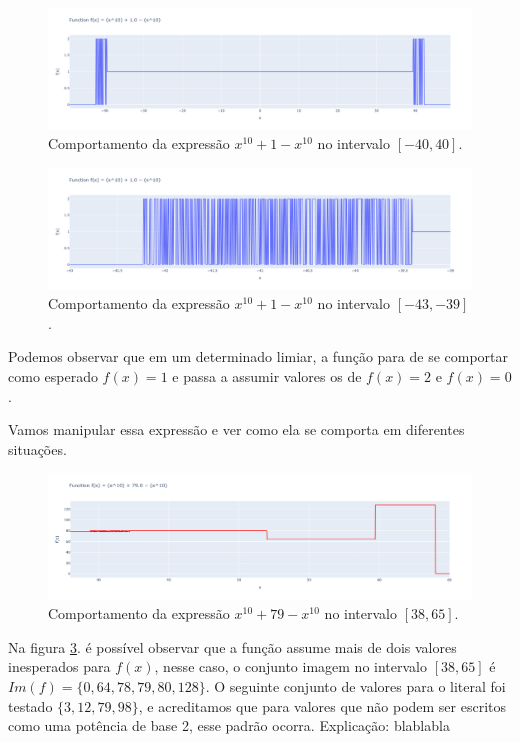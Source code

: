 \begin{figure}[h]
    \centering 
    \includegraphics[width=1\textwidth]{Imagens/catastrofic_cancelation.png}
    \caption{Comportamento da expressão \(x^{10} + 1 - x^{10}\) no intervalo \([-40, 40]\).}
    \label{fig:catastrofic_cancelation}
\end{figure}
\begin{figure}[h]
    \centering 
    \includegraphics[width=1\textwidth]{Imagens/zoom.png}
    \caption{Comportamento da expressão \(x^{10} + 1 - x^{10}\) no intervalo \([-43, -39]\).}
    \label{fig:zoom}
\end{figure}

Podemos observar que em um determinado limiar, a função para de se comportar como esperado $f(x) = 1$ e passa a assumir valores os de  $f(x) = 2$ e $f(x) = 0$.

Vamos manipular essa expressão e ver como ela se comporta em diferentes situações.

\begin{figure}[h]
    \centering 
    \includegraphics[width=1\textwidth]{Imagens/literal79.png}
    \caption{Comportamento da expressão \(x^{10} + 79 - x^{10}\) no intervalo \([38, 65]\).}
    \label{fig:literal79}
\end{figure}

Na figura  \ref{fig:literal79}. é possível observar que a função assume mais de dois valores inesperados para $f(x)$, nesse caso, o conjunto imagem no intervalo \([38, 65]\) é \( Im(f)  = \bigl\{ {0{,}64{,}78{,}79{,}80{,}128}\}\). 
O seguinte conjunto de valores para o literal foi testado \(\{3,12,79,98\}\), e acreditamos que para valores que não podem ser escritos como uma potência de base 2, esse padrão ocorra.
Explicação: blablabla



